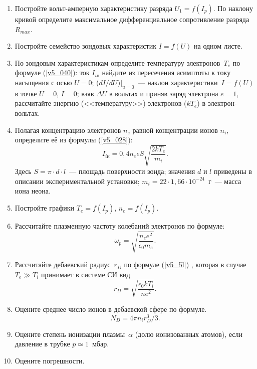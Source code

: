 \begin{enumerate}

\item Постройте вольт-амперную характеристику разряда $U_{1}=f(I_{p})$. По наклону кривой определите максимальное дифференциальное сопротивление разряда $R_{max}$.

\item Постройте семейство зондовых характеристик $I=f(U)$ на одном листе.

\item По зондовым характеристикам определите температуру электронов~$T_{e}$ по формуле (\eqref{v5_040}):%
 ток $I_{iн}$ %
 найдите из пересечения асимптоты к току насыщения с осью $U=0$; ($dI/dU)|_{u=0}$~--- наклон
характеристики~$I=f(U)$ в точке $U=0$, $I=0$; взяв $\Delta U$ в вольтах и приняв заряд электрона $e=1$, рассчитайте
энергию (<<температуру>>) электронов ($kT_{e}$) в электрон-вольтах.

\item Полагая концентрацию электронов $n_{e}$ равной концентрации ионов $n_{i}$, определите её из формулы (\eqref{v5_028}):%
\begin{equation}
I_{iн}=0,4n_{e}eS\sqrt{\frac{2kT_{e}}{m_{i}}}.
\end{equation}
Здесь $S=\pi\cdot d\cdot l$~--- площадь поверхности зонда; значения $d$ и $l$ приведены в описании экспериментальной
установки; $m_i=22\cdot 1,66\cdot 10^{-24}$~г~--- масса иона неона.

\item Постройте графики $T_e=f(I_p)$, $n_e=f(I_p)$.

\item Рассчитайте плазменную частоту колебаний электронов по формуле:
\begin{equation}
\omega_{p}=\sqrt{\frac{n_{e} e^2}{\epsilon_{0} m_{e}} }.
\end{equation}

\item Рассчитайте дебаевский радиус~$r_{D}$ по формуле (\eqref{v5_5l})%
, которая в случае $T_{e}\gg T_{i}$ принимает в системе СИ
вид
\begin{equation}
r_{D}=\sqrt{\frac{\epsilon_{0}kT_{i}}{ne^{2}}}.
\end{equation}

\item Оцените среднее число ионов в дебаевской сфере по формуле.
\begin{equation}
N_{D}=4\pi n_{i}r_{D}^{3}/3.
\end{equation}

\item Оцените степень ионизации плазмы~$\alpha$ (долю ионизованных атомов), если давление в трубке $p\simeq 1$~мбар.

\item Оцените погрешности.

 \end{enumerate}